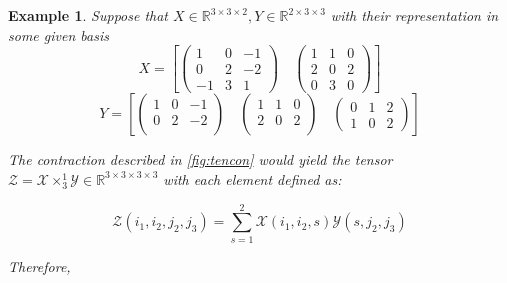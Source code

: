 \documentclass[11pt,a4paper,openright,oneside]{book}
\numberwithin{equation}{section}
\newtheorem{example0}[defn0]{Example}
\newenvironment{example}{ \begin{example0}\rm}{\end{example0}}
\newcommand{\figref}[1]{\cref{#1}}
\begin{document}
\begin{example}
    Suppose that $X \in \mathbb{R}^{3 \times 3 \times 2}, Y \in \mathbb{R}^{2 \times 3 \times 3}$ with their representation
    in some given basis
    $$X = \left[ 
    \begin{pmatrix}
        1 & 0 & -1 \\
        0 & 2 & -2 \\
        -1 & 3 & 1
    \end{pmatrix} \quad
    \begin{pmatrix}
        1 & 1 & 0 \\
        2 & 0 & 2 \\
        0 & 3 & 0
    \end{pmatrix}
    \right] $$
  $$Y = \left[ 
    \begin{pmatrix}
        1 & 0 & -1 \\
        0 & 2 & -2 \\
    \end{pmatrix} \quad
    \begin{pmatrix}
        1 & 1 & 0 \\
        2 & 0 & 2 \\
    \end{pmatrix} \quad
    \begin{pmatrix}
        0 & 1 & 2 \\
        1 & 0 & 2
    \end{pmatrix}
    \right] $$

The contraction described in \figref{fig:tencon} would yield the tensor $\mathcal{Z} = \mathcal{X} \times_3^1 \mathcal{Y} \in \mathbb{R}^{3 \times 3 \times 3 \times 3}$ with
each element defined as:

$$\mathcal{Z}(i_1, i_2, j_2, j_3) = \sum_{s=1}^2 \mathcal{X}(i_1, i_2, s) \mathcal{Y}(s, j_2, j_3)$$

Therefore,


\end{example}
\end{document}
